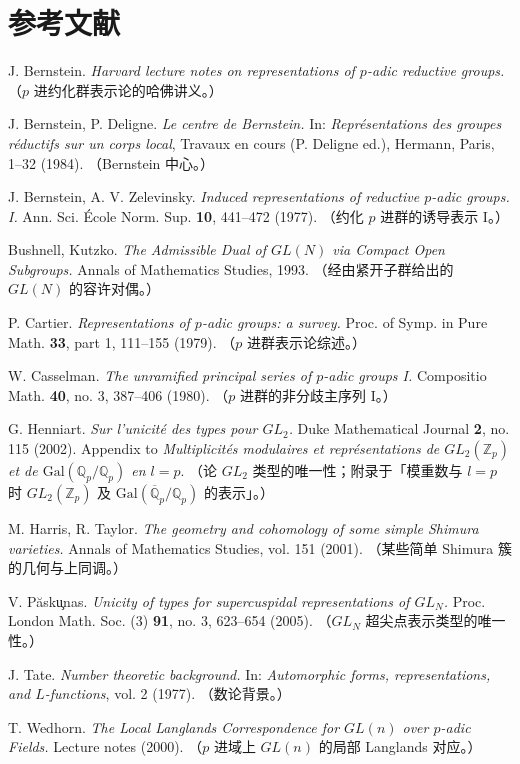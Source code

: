 \section*{参考文献}

\begin{enumerate}[label={[\arabic*]},leftmargin=3.2em,itemsep=0.15em]
\item J. Bernstein. \emph{Harvard lecture notes on representations of $p$-adic reductive groups.}
      （$p$ 进约化群表示论的哈佛讲义。）
\item J. Bernstein, P. Deligne. \emph{Le centre de Bernstein.}
      In: \emph{Représentations des groupes réductifs sur un corps local},
      Travaux en cours (P. Deligne ed.), Hermann, Paris, 1--32 (1984).
      （Bernstein 中心。）
\item J. Bernstein, A. V. Zelevinsky. \emph{Induced representations of reductive $p$-adic groups. I.}
      Ann. Sci. École Norm. Sup. \textbf{10}, 441--472 (1977).
      （约化 $p$ 进群的诱导表示 I。）
\item Bushnell, Kutzko. \emph{The Admissible Dual of $GL(N)$ via Compact Open Subgroups.}
      Annals of Mathematics Studies, 1993.
      （经由紧开子群给出的 $GL(N)$ 的容许对偶。）
\item P. Cartier. \emph{Representations of $p$-adic groups: a survey.}
      Proc. of Symp. in Pure Math. \textbf{33}, part 1, 111--155 (1979).
      （$p$ 进群表示论综述。）
\item W. Casselman. \emph{The unramified principal series of $p$-adic groups I.}
      Compositio Math. \textbf{40}, no. 3, 387--406 (1980).
      （$p$ 进群的非分歧主序列 I。）
\item G. Henniart. \emph{Sur l'unicité des types pour $GL_2$.}
      Duke Mathematical Journal \textbf{2}, no. 115 (2002). Appendix to
      \emph{Multiplicités modulaires et représentations de $GL_2(\mathbb{Z}_p)$
      et de $\mathrm{Gal}(\mathbb{Q}_p/\mathbb{Q}_p)$ en $l=p$}.
      （论 $GL_2$ 类型的唯一性；附录于「模重数与 $l=p$ 时 $GL_2(\mathbb{Z}_p)$
      及 $\mathrm{Gal}(\overline{\mathbb{Q}}_p/\mathbb{Q}_p)$ 的表示」。）
\item M. Harris, R. Taylor. \emph{The geometry and cohomology of some simple Shimura varieties.}
      Annals of Mathematics Studies, vol. 151 (2001).
      （某些简单 Shimura 簇的几何与上同调。）
\item V. Păsku̧nas. \emph{Unicity of types for supercuspidal representations of $GL_N$.}
      Proc. London Math. Soc. (3) \textbf{91}, no. 3, 623--654 (2005).
      （$GL_N$ 超尖点表示类型的唯一性。）
\item J. Tate. \emph{Number theoretic background.}
      In: \emph{Automorphic forms, representations, and $L$-functions}, vol. 2 (1977).
      （数论背景。）
\item T. Wedhorn. \emph{The Local Langlands Correspondence for $GL(n)$ over $p$-adic Fields.}
      Lecture notes (2000).
      （$p$ 进域上 $GL(n)$ 的局部 Langlands 对应。）
\end{enumerate}

